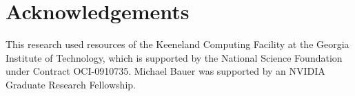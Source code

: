 \documentclass[conference]{IEEEtran}
\begin{document}








\section*{Acknowledgements}
This research used resources of the Keeneland Computing Facility at the
Georgia Institute of Technology, which is supported by the National
Science Foundation under Contract OCI-0910735.  Michael Bauer was supported
by an NVIDIA Graduate Research Fellowship.


\end{document}
